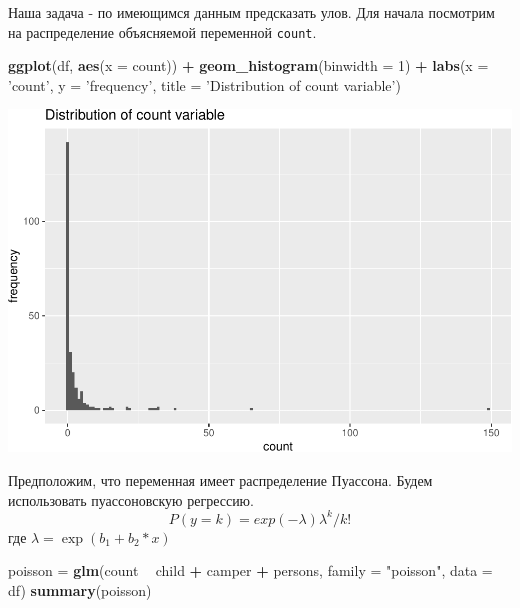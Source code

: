 \documentclass[]{book}
\newenvironment{Shaded}{\begin{snugshade}}{\end{snugshade}}
\newcommand{\DataTypeTok}[1]{\textcolor[rgb]{0.13,0.29,0.53}{#1}}
\newcommand{\DecValTok}[1]{\textcolor[rgb]{0.00,0.00,0.81}{#1}}
\newcommand{\KeywordTok}[1]{\textcolor[rgb]{0.13,0.29,0.53}{\textbf{#1}}}
\newcommand{\NormalTok}[1]{#1}
\newcommand{\OperatorTok}[1]{\textcolor[rgb]{0.81,0.36,0.00}{\textbf{#1}}}
\newcommand{\StringTok}[1]{\textcolor[rgb]{0.31,0.60,0.02}{#1}}
\begin{document}
Наша задача - по имеющимся данным предсказать улов. Для начала посмотрим на распределение объясняемой переменной \texttt{count}.

\begin{Shaded}
\begin{Highlighting}[]
\KeywordTok{ggplot}\NormalTok{(df, }\KeywordTok{aes}\NormalTok{(}\DataTypeTok{x =}\NormalTok{ count)) }\OperatorTok{+}\StringTok{ }\KeywordTok{geom_histogram}\NormalTok{(}\DataTypeTok{binwidth =} \DecValTok{1}\NormalTok{) }\OperatorTok{+}\StringTok{ }\KeywordTok{labs}\NormalTok{(}\DataTypeTok{x =} \StringTok{'count'}\NormalTok{, }\DataTypeTok{y =} \StringTok{'frequency'}\NormalTok{, }\DataTypeTok{title =} \StringTok{'Distribution of count variable'}\NormalTok{)}
\end{Highlighting}
\end{Shaded}

\includegraphics{05-poisreg_files/figure-latex/hist-1.pdf}

Предположим, что переменная имеет распределение Пуассона. Будем использовать пуассоновскую регрессию.
\[
P(y=k)=exp(-\lambda) \lambda^k / k!
\]
где \(\lambda=\exp(b_1 +b_2*x)\)

\begin{Shaded}
\begin{Highlighting}[]
\NormalTok{poisson =}\StringTok{ }\KeywordTok{glm}\NormalTok{(count }\OperatorTok{~}\StringTok{ }\NormalTok{child }\OperatorTok{+}\StringTok{ }\NormalTok{camper }\OperatorTok{+}\StringTok{  }\NormalTok{persons, }\DataTypeTok{family =} \StringTok{"poisson"}\NormalTok{, }\DataTypeTok{data =}\NormalTok{ df)}
\KeywordTok{summary}\NormalTok{(poisson)}
\end{Highlighting}
\end{Shaded}
\end{document}
